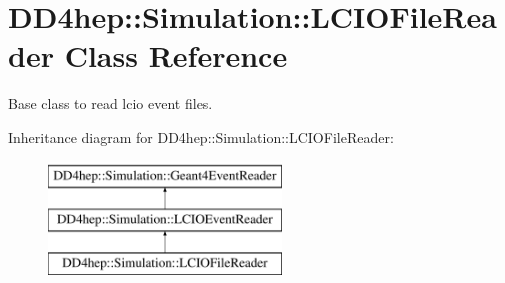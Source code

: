 \hypertarget{class_d_d4hep_1_1_simulation_1_1_l_c_i_o_file_reader}{}\section{D\+D4hep\+:\+:Simulation\+:\+:L\+C\+I\+O\+File\+Reader Class Reference}
\label{class_d_d4hep_1_1_simulation_1_1_l_c_i_o_file_reader}


Base class to read lcio event files.  


Inheritance diagram for D\+D4hep\+:\+:Simulation\+:\+:L\+C\+I\+O\+File\+Reader\+:\begin{figure}[H]
\begin{center}
\leavevmode
\includegraphics[height=3.000000cm]{class_d_d4hep_1_1_simulation_1_1_l_c_i_o_file_reader}
\end{center}
\end{figure}
